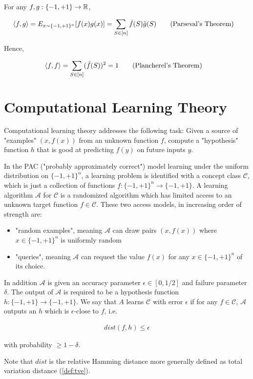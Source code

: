 \documentclass[main.tex]{subfiles}
\begin{document}
\begin{theorem}
For any $f, g: \{-1, +1\} \rightarrow \mathbb{R}$,

\begin{align}
\label{eq:parsev}
\langle f, g \rangle &= E_{x \sim \{-1, +1\}^n}[f(x)g(x)] = \sum_{S \in [n]} \hat{f}(S) \hat{g}(S)\tag{Parseval's Theorem}
\end{align}

Hence,

\begin{align*}
\langle f, f \rangle &= \sum_{S \in [n]} (\hat{f}(S))^2 = 1 \tag{Plancherel's Theorem}
\end{align*}
\end{theorem}

\section{Computational Learning Theory}

Computational learning theory addresses the following task: Given a source of "examples" $(x, f(x))$ from an unknown function $f$, compute a "hypothesis" function $h$ that is good at predicting $f(y)$ on future inputs $y$. 

\begin{definition}
\label{def:PAC}
In the PAC ("probably approximately correct") model learning under the uniform distribution on $\{-1, +1\}^n$, a learning problem is identified with a concept class $\mathcal{C}$, which is just a collection of functions $f: \{-1, +1\}^n \rightarrow \{-1, +1\}$. A learning algorithm $\mathcal{A}$ for $\mathcal{C}$ is a randomized algorithm which has limited access to an unknown target function $f \in \mathcal{C}$. These two access models, in increasing order of strength are:

\begin{itemize}
\item "random examples", meaning $\mathcal{A}$ can draw pairs $(x, f(x))$ where $x \in \{-1, +1\}^n$ is uniformly random
\item "queries", meaning $\mathcal{A}$ can request the value $f(x)$ for any $x \in \{-1, +1\}^n$ of its choice. 
\end{itemize}

In addition $\mathcal{A}$ is given an accuracy parameter $\epsilon \in [0, 1/2]$ and failure parameter $\delta$. The output of $\mathcal{A}$ is required to be a hypothesis function $h : \{-1, +1\} \rightarrow \{ -1, +1 \}$. We say that $A$ learns $\mathcal{C}$ with error $\epsilon$ if for any $f \in \mathcal{C}$, $\mathcal{A}$ outputs an $h$ which is $\epsilon$-close to $f$, i.e.

\begin{align*}
dist(f, h) \leq \epsilon	
\end{align*}

with probability $\geq 1 - \delta$. 

Note that $dist$ is the relative Hamming distance more generally defined as total variation distance (\ref{def:tve}).  
\end{definition}
\end{document}
